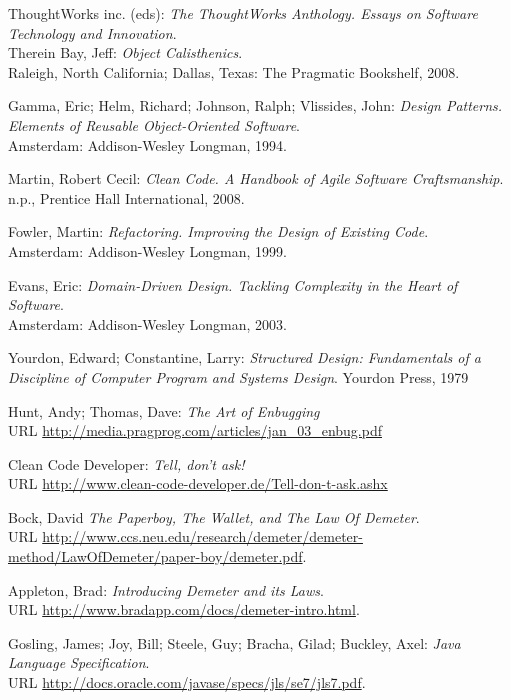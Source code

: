 \documentclass[11pt,a4paper,oneside, 
liststotoc, 					%
bibtotoc,						%
titlepage, 						%
headsepline, 					%
BCOR6mm,						%
english
]{scrreprt}
\begin{document}
\begin{thebibliography}{999999}

 ThoughtWorks inc. (eds): 
\emph{The ThoughtWorks Anthology. Essays on Software Technology and Innovation}. \\ Therein Bay, Jeff: \emph{Object Calisthenics}.\\ Raleigh, North California; Dallas, Texas: The Pragmatic Bookshelf, 2008.

 Gamma, Eric; Helm, Richard; Johnson, Ralph; Vlissides,  John:
\emph{Design Patterns. Elements of Reusable Object-Oriented Software}. \\ Amsterdam: Addison-Wesley Longman, 1994.
  
 Martin, Robert Cecil:
\emph{Clean Code. A Handbook of Agile Software Craftsmanship}. \\ n.p., Prentice Hall International, 2008.

 Fowler, Martin:
\emph{Refactoring. Improving the Design of Existing Code}. \\ Amsterdam: Addison-Wesley Longman, 1999. 

 Evans, Eric:
\emph{Domain-Driven Design. Tackling Complexity in the Heart of Software}. \\ Amsterdam: Addison-Wesley Longman, 2003. 

 Yourdon, Edward; Constantine, Larry:
\emph{Structured Design: Fundamentals of a Discipline of Computer Program and Systems Design}. Yourdon Press, 1979

 Hunt, Andy; Thomas, Dave:
\emph{The Art of Enbugging} \\ URL \url{http://media.pragprog.com/articles/jan_03_enbug.pdf}

 Clean Code Developer:
\emph{Tell, don't ask!} \\ URL \url{http://www.clean-code-developer.de/Tell-don-t-ask.ashx}

 Bock, David
\emph{The Paperboy, The Wallet, and The Law Of Demeter}. \\ URL \url{http://www.ccs.neu.edu/research/demeter/demeter-method/LawOfDemeter/paper-boy/demeter.pdf}.

 Appleton, Brad:
\emph{Introducing Demeter and its Laws}. \\ URL \url{http://www.bradapp.com/docs/demeter-intro.html}.

 Gosling, James; Joy, Bill; Steele, Guy; Bracha, Gilad; Buckley, Axel:
\emph{Java Language Specification}. \\ URL \url{http://docs.oracle.com/javase/specs/jls/se7/jls7.pdf}.


\end{thebibliography}
\end{document}
